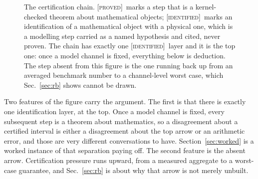 \documentclass[aps,pra,reprint,nofootinbib,superscriptaddress]{revtex4-2}
\theoremstyle{plain}
\theoremstyle{definition}
\theoremstyle{remark}
\newcommand{\ddist}{D_{\diamond}}
\newcommand{\Kchecked}{\textsc{[proved]}}
\newcommand{\Kcited}{\textsc{[identified]}}
\begin{document}
\begin{figure}
\centering
{}
\caption{The certification chain. \Kchecked\ marks a step that is a
kernel-checked theorem about mathematical objects; \Kcited\ marks an
identification of a mathematical object with a physical one, which is a
modelling step carried as a named hypothesis and cited, never proven.
The chain has exactly one \Kcited\ layer and it is the top one: once a
model channel is fixed, everything below is deduction. The step absent
from this figure is the one running back up from an averaged benchmark
number to a channel-level worst case, which Sec.~\ref{sec:rb} shows
cannot be drawn.}
\label{fig:chain}
\end{figure}

Two features of the figure carry the argument. The first is that there is
exactly one identification layer, at the top. Once a model channel is
fixed, every subsequent step is a theorem about mathematics, so a
disagreement about a certified interval is either a disagreement about
the top arrow or an arithmetic error, and those are very different
conversations to have. Section~\ref{sec:worked} is a worked instance of
that separation paying off. The second feature is the absent arrow.
Certification pressure runs upward, from a measured aggregate to a
worst-case guarantee, and Sec.~\ref{sec:rb} is about why that arrow is
not merely unbuilt.
\end{document}
